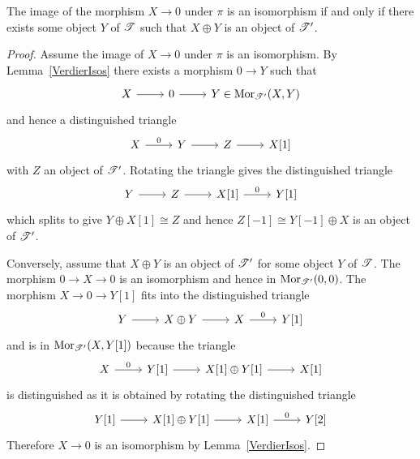 \documentclass[dissertation.tex]{subfiles}
\begin{document}
\begin{lem}\label{VerdierZeroIso}
  The image of the morphism $X \rightarrow 0$ under $\pi$ is an isomorphism if and only if there exists some object $Y$ of $\mathscr{T}$ such that $X \oplus Y$ is an object of $\mathscr{T}^\prime$.
  
  \begin{proof}
    Assume the image of $X \rightarrow 0$ under $\pi$ is an isomorphism.
    By Lemma~\ref{VerdierIsos} there exists a morphism $0 \rightarrow Y$ such that
    $$\begin{tikzcd}
      X \arrow{r} & 0 \arrow{r} & Y \in \Mor{\T^\prime}(X,Y)
    \end{tikzcd}$$
    and hence a distinguished triangle
    $$\begin{tikzcd}
      X \arrow{r}{0} & Y \arrow{r} & Z \arrow{r} & X[1]
    \end{tikzcd}$$
    with $Z$ an object of $\mathscr{T}^\prime$.
    Rotating the triangle gives the distinguished triangle
    $$\begin{tikzcd}
      Y \arrow{r} & Z \arrow{r} & X[1] \arrow{r}{0} & Y[1]
    \end{tikzcd}$$
    which splits to give $Y \oplus X[1] \cong Z$ and hence $Z[-1] \cong Y[-1] \oplus X$ is an object of $\mathscr{T}^\prime$.
    
    Conversely, assume that $X \oplus Y$ is an object of $\mathscr{T}^\prime$ for some object $Y$ of $\mathscr{T}$.
    The morphism $0 \rightarrow X \rightarrow 0$ is an isomorphism and hence in $\operatorname{Mor}_{\mathscr{T}^\prime}(0,0)$.
    The morphism $X \rightarrow 0 \rightarrow Y[1]$ fits into the distinguished triangle
    $$\begin{tikzcd}
      Y \arrow{r} & X \oplus Y \arrow{r} & X \arrow{r}{0} & Y[1]
    \end{tikzcd}$$
    and is in $\operatorname{Mor}_{\mathscr{T}^\prime}(X,Y[1])$ because the triangle
    $$\begin{tikzcd}
      X \arrow{r}{0} & Y[1] \arrow{r} & X[1] \oplus Y[1] \arrow{r} & X[1]
    \end{tikzcd}$$
    is distinguished as it is obtained by rotating the distinguished triangle
    $$\begin{tikzcd}
      Y[1] \arrow{r} & X[1] \oplus Y[1] \arrow{r} & X[1] \arrow{r}{0} & Y[2]
    \end{tikzcd}$$
    Therefore $X \rightarrow 0$ is an isomorphism by Lemma~\ref{VerdierIsos}.
  \end{proof}
\end{lem}
\end{document}
